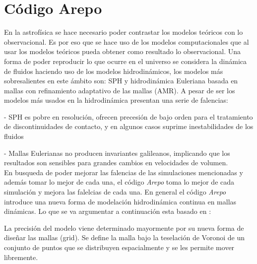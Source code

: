 \section{Código Arepo}
\label{sec: codigo arepo}


En la astrofísica se hace necesario poder contrastar los modelos teóricos con lo observacional. Es por eso que se hace uso de los modelos computacionales que al usar los modelos teóricos pueda obtener como resultado lo observacional. Una forma de poder reproducir lo que ocurre en el universo se considera la dinámica de fluidos haciendo uso de los modelos hidrodinámicos, los modelos más sobresalientes en este ámbito son: SPH \cite{monaghan1992} y hidrodinámica Euleriana basada en mallas \cite{stone2008} con refinamiento adaptativo de las mallas (AMR). A pesar de ser los modelos más usados en la hidrodinámica presentan una serie de falencias:

- SPH es pobre en resolución,  ofrecen precesión de bajo orden para el tratamiento de discontinuidades de contacto, y en algunos casos suprime inestabilidades de los fluidos

- Mallas Eulerianas no producen invariantes galileanos, implicando que los resultados son sensibles para grandes cambios en velocidades de volumen.\\

En busqueda de poder mejorar las falencias de las simulaciones mencionadas y además tomar lo mejor de cada una, el código  {\it{Arepo}} toma lo mejor de cada simulación y mejora las falelcias de cada una. En general el código {\it{Arepo}} \cite{springel2010} introduce una nueva forma de modelación hidrodinámica continua en mallas dinámicas. Lo que se va argumentar a continuación esta basado en \cite{springel2010}:

La precisión del modelo viene determinado mayormente por su nueva forma de diseñar las mallas (grid). Se define la malla bajo la teselación de Voronoi de un conjunto de puntos que se distribuyen espacialmente y se les permite mover libremente. 

